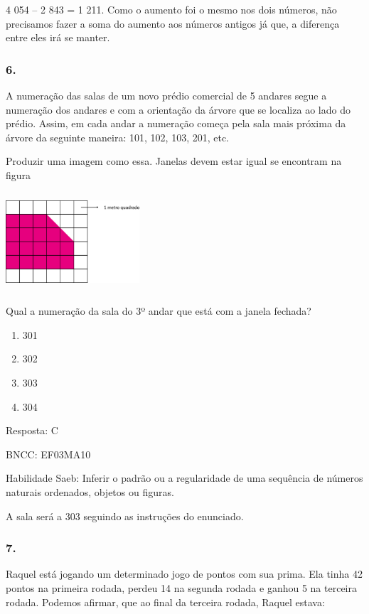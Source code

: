 4 054 -- 2 843 = 1 211. Como o aumento foi o mesmo nos dois números, não
precisamos fazer a soma do aumento aos números antigos já que, a
diferença entre eles irá se manter.

\subsubsection{6.}\label{section-131}

A numeração das salas de um novo prédio comercial de 5 andares segue a
numeração dos andares e com a orientação da árvore que se localiza ao
lado do prédio. Assim, em cada andar a numeração começa pela sala mais
próxima da árvore da seguinte maneira: 101, 102, 103, 201, etc.

Produzir uma imagem como essa. Janelas devem estar igual se encontram na
figura

\includegraphics[width=1.96154in,height=1.44792in]{media/image108.png}

Qual a numeração da sala do 3º andar que está com a janela fechada?

\begin{enumerate}
\def\labelenumi{\alph{enumi})}
\item
  301
\item
  302
\item
  303
\item
  304
\end{enumerate}

Resposta: C

BNCC: EF03MA10

Habilidade Saeb: Inferir o padrão ou a regularidade de uma sequência de
números naturais ordenados, objetos ou figuras.

A sala será a 303 seguindo as instruções do enunciado.

\subsubsection{7.}\label{section-132}

Raquel está jogando um determinado jogo de pontos com sua prima. Ela
tinha 42 pontos na primeira rodada, perdeu 14 na segunda rodada e ganhou
5 na terceira rodada. Podemos afirmar, que ao final da terceira rodada,
Raquel estava:

